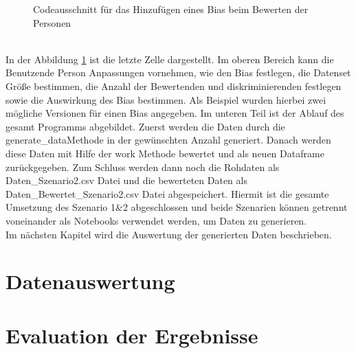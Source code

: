 \begin{onehalfspace}
\begin{figure}[h]
    \caption{Codeausschnitt für das Hinzufügen eines Bias beim Bewerten der Personen}
    \label{fig:Sz2Finish}
\end{figure}\\
In der Abbildung \ref{fig:Sz2Finish} ist die letzte Zelle dargestellt. Im oberen Bereich kann die Benutzende Person Anpassungen vornehmen, wie den Bias festlegen, die Datenset Größe bestimmen, die Anzahl der Bewertenden und diskriminierenden festlegen sowie die Auswirkung des Bias bestimmen. Als Beispiel wurden hierbei zwei mögliche Versionen für einen Bias angegeben. Im unteren Teil ist der Ablauf des gesamt Programms abgebildet. Zuerst werden die Daten durch die \glqq{}generate\_data\grqq{}Methode in der gewünschten Anzahl generiert. Danach werden diese Daten mit Hilfe der \glqq{}work\grqq{} Methode bewertet und als neuen Dataframe zurückgegeben. Zum Schluss werden dann noch die Rohdaten als \glqq{}Daten\_Szenario2.csv\grqq{} Datei und die bewerteten Daten als \glqq{}Daten\_Bewertet\_Szenario2.csv\grqq{} Datei abgespeichert.
Hiermit ist die gesamte Umsetzung des Szenario 1\&2 abgeschlossen und beide Szenarien können getrennt voneinander als Notebooks verwendet werden, um Daten zu generieren.\\
Im nächsten Kapitel wird die Auswertung der generierten Daten beschrieben.
\newpage
\section{Datenauswertung}
\label{datenauswerung}
\section{Evaluation der Ergebnisse}
\label{evaluation}
\end{onehalfspace}